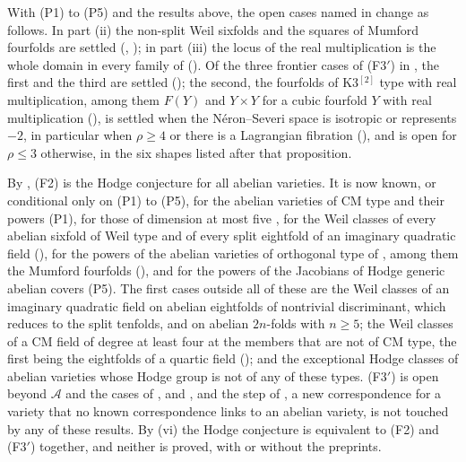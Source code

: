 \begin{remark}\label{rem:remains}
With (P1) to (P5) and the results above, the open cases named in
 change as follows. In part (ii) the non-split Weil
sixfolds and the squares of Mumford fourfolds are settled
(, ); in part (iii) the locus of the
real multiplication is the whole domain in every family of 
(). Of the three frontier cases of \textup{(F3$'$)} in
, the first and the third are settled
(); the second, the fourfolds of K3$^{[2]}$ type with real
multiplication, among them $F(Y)$ and $Y\times Y$ for a cubic fourfold $Y$
with real multiplication (), is settled when the
N\'eron--Severi space is isotropic or represents $-2$, in particular when
$\rho\ge4$ or there is a Lagrangian fibration (),
and is open for $\rho\le3$ otherwise, in the six shapes listed after that
proposition.

By , (F2) is the Hodge conjecture for all abelian
varieties. It is now known, or conditional only on (P1) to (P5), for the
abelian varieties of CM type and their powers (P1), for those of dimension at
most five \cite{Mar25a,Mar25b,MZ99}, for the Weil classes of every abelian
sixfold of Weil type and of every split eightfold of an imaginary quadratic
field (), for the powers of the abelian varieties of
orthogonal type of , among them the Mumford fourfolds
(), and for the powers of the Jacobians of Hodge
generic abelian covers (P5). The first cases outside all of these are the
Weil classes of an imaginary quadratic field on abelian eightfolds of
nontrivial discriminant, which  reduces to the split
tenfolds, and on abelian $2n$-folds with $n\ge5$; the Weil classes of a CM
field of degree at least four at the members that are not of CM type, the
first being the eightfolds of a quartic field (); and
the exceptional Hodge classes of abelian varieties whose Hodge group is not
of any of these types. \textup{(F3$'$)} is open beyond $\mathcal{A}$ and the
cases of ,  and
, and the step of
, a new correspondence for a variety that no known
correspondence links to an abelian variety, is not touched by any of these
results. By (vi) the Hodge conjecture is equivalent to (F2)
and \textup{(F3$'$)} together, and neither is proved, with or without the
preprints.
\end{remark}

